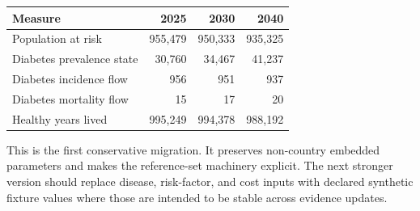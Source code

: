 \documentclass[11pt]{article}
\newcommand{\sectiontitle}[1]{\vspace{9pt}{\large\bfseries #1}\par\vspace{-2pt}}
\begin{document}
\sectiontitle{Headline outputs}
\begin{tabularx}{\textwidth}{@{}p{2.85in}rrr@{}}
\toprule
\textbf{Measure} & \textbf{2025} & \textbf{2030} & \textbf{2040}\\
\midrule
Population at risk & 955,479 & 950,333 & 935,325\\
Diabetes prevalence state & 30,760 & 34,467 & 41,237\\
Diabetes incidence flow & 956 & 951 & 937\\
Diabetes mortality flow & 15 & 17 & 20\\
Healthy years lived & 995,249 & 994,378 & 988,192\\
\bottomrule
\end{tabularx}

\sectiontitle{Limits}
This is the first conservative migration. It preserves non-country embedded parameters and makes the reference-set machinery explicit. The next stronger version should replace disease, risk-factor, and cost inputs with declared synthetic fixture values where those are intended to be stable across evidence updates.
\end{document}
